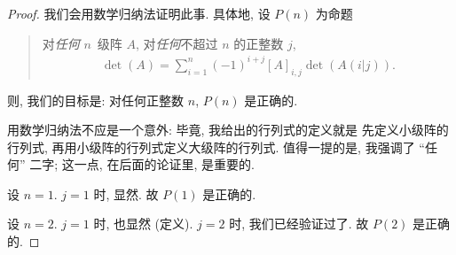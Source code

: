 \begin{proof}
    我们会用数学归纳法证明此事.
    具体地, 设 \(P(n)\) 为命题
    \begin{quotation}
        对\emph{任何} \(n\)~级阵 \(A\),
        对\emph{任何}不超过 \(n\) 的正整数 \(j\),
        \begin{align*}
            \det {(A)} = \sum_{i = 1}^{n}
            {(-1)^{i+j} [A]_{i,j} \det {(A(i|j))}}.
        \end{align*}
    \end{quotation}
    则, 我们的目标是:
    对任何正整数 \(n\), \(P(n)\) 是正确的.

    用数学归纳法不应是一个意外:
    毕竟, 我给出的行列式的定义就是%
    先定义小级阵的行列式,
    再用小级阵的行列式定义大级阵的行列式.
    值得一提的是, 我强调了 ``任何'' 二字;
    这一点, 在后面的论证里, 是重要的.

    设 \(n = 1\).
    \(j = 1\) 时, 显然.
    故 \(P(1)\) 是正确的.

    设 \(n = 2\).
    \(j = 1\) 时, 也显然 (定义).
    \(j = 2\) 时, 我们已经验证过了.
    故 \(P(2)\) 是正确的.


\end{proof}
